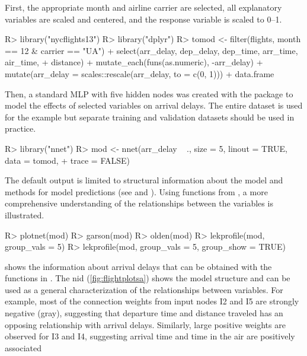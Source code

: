 \documentclass[article]{jss}
\begin{document}
First, the appropriate month and airline carrier are selected, all
explanatory variables are scaled and centered, and the response variable is
scaled to 0--1.
%
\begin{Schunk}
\begin{Sinput}
R> library("nycflights13")
R> library("dplyr")
R> tomod <- filter(flights, month == 12 & carrier == "UA") %
+    select(arr_delay, dep_delay, dep_time, arr_time, air_time,
+      distance) %
+    mutate_each(funs(as.numeric), -arr_delay) %
+    mutate(arr_delay = scales::rescale(arr_delay, to = c(0, 1))) %
+    data.frame
\end{Sinput}
\end{Schunk}
%
Then, a standard MLP with five hidden nodes was created with the
 package to model the effects of selected variables on
arrival delays. The entire dataset is used for the example but
separate training and validation datasets should be used in practice.
%
\begin{Schunk}
\begin{Sinput}
R> library("nnet")
R> mod <- nnet(arr_delay ~ ., size = 5, linout = TRUE, data = tomod,
+    trace = FALSE)  
\end{Sinput}
\end{Schunk}
%
The default output is limited to structural information about the model and methods for model predictions (see  and ). Using functions from , a more comprehensive understanding of the relationships between the variables is illustrated.
%
\begin{Schunk}
\begin{Sinput}
R> plotnet(mod)
R> garson(mod)
R> olden(mod)
R> lekprofile(mod, group_vals = 5)
R> lekprofile(mod, group_vals = 5, group_show = TRUE)
\end{Sinput}
\end{Schunk}
%
 shows the information about arrival delays that
can be obtained with the functions in . The
\ac{nid} (\ref{fig:flightplotsa}) shows the model structure and can be
used as a general characterization of the relationships between
variables.  For example, most of the connection weights from input
nodes I2 and I5 are strongly negative (gray), suggesting that departure 
time and distance traveled has an opposing relationship with arrival 
delays. Similarly, large positive weights are observed for I3 and I4, 
suggesting arrival time and time in the air are positively associated 
\end{document}
